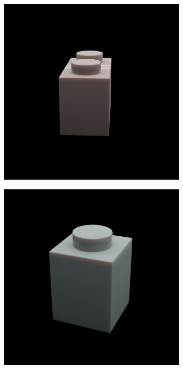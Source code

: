 \documentclass[]{article}
\begin{document}
\begin{figure}[h]
\begin{subfigure}[b]{0.2\textwidth}
    \end{subfigure}
    \begin{subfigure}[b]{0.2\textwidth}
        \includegraphics[width=\textwidth]{generated images/33.png}
    \end{subfigure}
    \begin{subfigure}[b]{0.2\textwidth}
        \includegraphics[width=\textwidth]{generated images/34.png}

\end{subfigure}
\end{figure}
\end{document}
